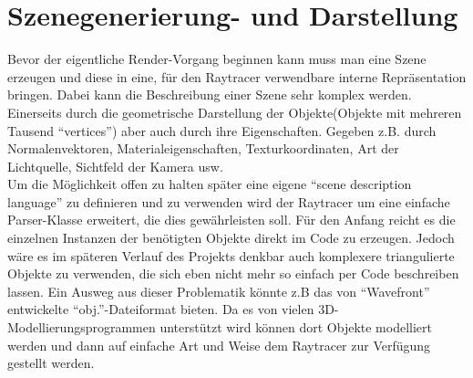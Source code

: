 \section{Szenegenerierung- und Darstellung}

Bevor der eigentliche Render-Vorgang beginnen kann muss man eine Szene erzeugen und diese in eine, für den Raytracer verwendbare interne Repräsentation bringen. Dabei kann die Beschreibung einer Szene sehr komplex werden. Einerseits durch die geometrische Darstellung der Objekte(Objekte mit mehreren Tausend "`vertices"') aber auch durch ihre Eigenschaften. Gegeben z.B. durch Normalenvektoren, Materialeigenschaften, Texturkoordinaten, Art der Lichtquelle, Sichtfeld der Kamera usw.\\


Um die Möglichkeit offen zu halten später eine eigene "`scene description language"' zu definieren und zu verwenden wird der Raytracer um eine einfache Parser-Klasse erweitert, die dies gewährleisten soll. Für den Anfang reicht es die einzelnen Instanzen der benötigten Objekte direkt im Code zu erzeugen. Jedoch wäre es im späteren Verlauf des Projekts denkbar auch komplexere triangulierte Objekte zu verwenden, die sich eben nicht mehr so einfach per Code beschreiben lassen. Ein Ausweg aus dieser Problematik könnte z.B das von "`Wavefront"' entwickelte "`obj."'-Dateiformat bieten. Da es von vielen 3D-Modellierungsprogrammen 
unterstützt wird können dort Objekte modelliert werden und dann auf einfache Art und Weise dem Raytracer zur Verfügung gestellt werden. 